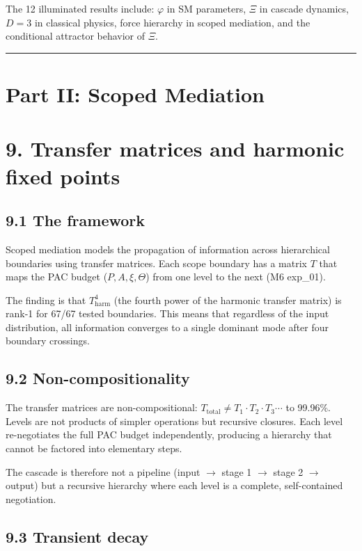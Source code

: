 \documentclass[11pt,a4paper]{article}
\begin{document}
The 12 illuminated results include: $\varphi$ in SM parameters, $\Xi$ in cascade dynamics, $D = 3$ in classical physics, force hierarchy in scoped mediation, and the conditional attractor behavior of $\Xi$.

\begin{center}\rule{0.5\linewidth}{0.4pt}\end{center}

\section*{Part II: Scoped Mediation}

\section*{9. Transfer matrices and harmonic fixed points}

\subsection*{9.1 The framework}

Scoped mediation models the propagation of information across hierarchical boundaries using transfer matrices. Each scope boundary has a matrix $T$ that maps the PAC budget ($P, A, \xi, \Theta$) from one level to the next (M6 exp\_01).

The finding is that $T_{\text{harm}}^4$ (the fourth power of the harmonic transfer matrix) is rank-1 for 67/67 tested boundaries. This means that regardless of the input distribution, all information converges to a single dominant mode after four boundary crossings.

\subsection*{9.2 Non-compositionality}

The transfer matrices are non-compositional: $T_{\text{total}} \neq T_1 \cdot T_2 \cdot T_3 \cdots$ to 99.96\%. Levels are not products of simpler operations but recursive closures. Each level re-negotiates the full PAC budget independently, producing a hierarchy that cannot be factored into elementary steps.

The cascade is therefore not a pipeline (input $\to$ stage 1 $\to$ stage 2 $\to$ output) but a recursive hierarchy where each level is a complete, self-contained negotiation.

\subsection*{9.3 Transient decay}
\end{document}
